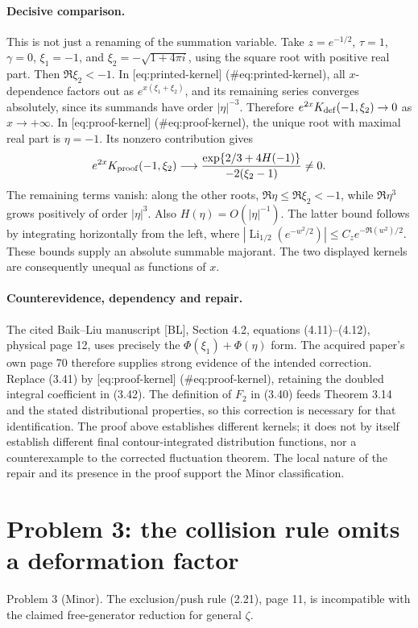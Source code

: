 \documentclass[10pt]{article}
\begin{document}
\paragraph*{Decisive comparison.}\mbox{}\par
This is not just a renaming of the summation variable. Take \(z=e^{-1/2}\), \(\tau=1\), \(\gamma=0\), \(\xi_1=-1\), and \(\xi_2=-\sqrt{1+4\pi i}\), using the square root with positive real part. Then \(\Re\xi_2<-1\). In [eq:printed-kernel] (\#eq:printed-kernel), all \(x\)-dependence factors out as \(e^{x(\xi_1+\xi_2)}\), and its remaining series converges absolutely, since its summands have order \(|\eta|^{-3}\). Therefore \(e^{2x}K_{\rm def}(-1,\xi_2)\to0\) as \(x\to+\infty\). In [eq:proof-kernel] (\#eq:proof-kernel), the unique root with maximal real part is \(\eta=-1\). Its nonzero contribution gives \[e^{2x}K_{\rm proof}(-1,\xi_2)
 \longrightarrow
 \frac{\exp\{2/3+4H(-1)\}}{-2(\xi_2-1)}\ne0.\] The remaining terms vanish: along the other roots, \(\Re\eta\leq\Re\xi_2<-1\), while \(\Re\eta^3\) grows positively of order \(|\eta|^3\). Also \(H(\eta)=O(|\eta|^{-1})\). The latter bound follows by integrating horizontally from the left, where \(|\operatorname{Li}_{1/2}(e^{-w^2/2})|
 \leq C_z e^{-\Re(w^2)/2}\). These bounds supply an absolute summable majorant. The two displayed kernels are consequently unequal as functions of \(x\).\par
\paragraph*{Counterevidence, dependency and repair.}\mbox{}\par
The cited Baik–Liu manuscript [BL], Section 4.2, equations (4.11)–(4.12), physical page 12, uses precisely the \(\Phi(\xi_1)+\Phi(\eta)\) form. The acquired paper’s own page 70 therefore supplies strong evidence of the intended correction. Replace (3.41) by [eq:proof-kernel] (\#eq:proof-kernel), retaining the doubled integral coefficient in (3.42). The definition of \(F_2\) in (3.40) feeds Theorem 3.14 and the stated distributional properties, so this correction is necessary for that identification. The proof above establishes different kernels; it does not by itself establish different final contour-integrated distribution functions, nor a counterexample to the corrected fluctuation theorem. The local nature of the repair and its presence in the proof support the Minor classification.\par
\section*{Problem 3: the collision rule omits a deformation factor}
Problem 3 (Minor).  The exclusion/push rule (2.21), page 11, is incompatible with the claimed free-generator reduction for general \(\zeta\).\par
\end{document}
